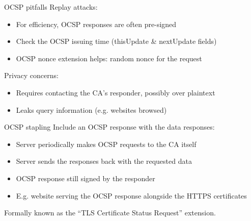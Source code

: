 \begin{frame}{OCSP pitfalls}  
  \pause
  Replay attacks:
  \begin{itemize}[<+(1)->]
    \item For efficiency, OCSP responses are often pre-signed
    \item Check the OCSP issuing time (thisUpdate \& nextUpdate fields)
    \item OCSP nonce extension helps: random nonce for the request
  \end{itemize}

  \vspace*{0.5em}

  \pause
  Privacy concerns:
  \begin{itemize}[<+(1)->]
    \item Requires contacting the CA's responder, possibly over plaintext
    \item Leaks query information (e.g. websites browsed)
  \end{itemize}
\end{frame}

\begin{frame}{OCSP stapling}
  \pause
  Include an OCSP response with the data responses:
  \begin{itemize}[<+(1)->]
    \item Server periodically makes OCSP requests to the CA itself
    \item Server sends the responses back with the requested data
    \item OCSP response still signed by the responder
    \item E.g. website serving the OCSP response alongside the HTTPS certificates
  \end{itemize}

  \pause
  Formally known as the \enquote{TLS Certificate Status Request} extension.
\end{frame}

